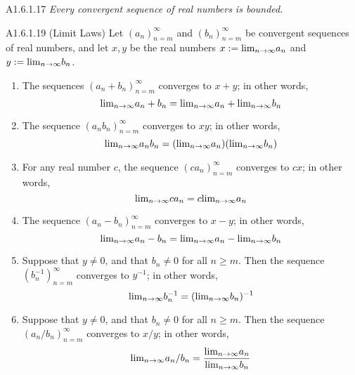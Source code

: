 \begin{corollary}{A1.6.1.17}
    \emph{Every convergent sequence of real numbers is bounded}.
\end{corollary}

\begin{theorem}{A1.6.1.19}
    (Limit Laws) Let $(a_n)_{n=m}^{\infty}$ and $(b_n)_{n=m}^{\infty}$ be convergent
    sequences of real numbers, and let $x, y$ be the real numbers $x := \text{lim}_{n \rightarrow \infty}{a_n}$
    and $y:= \text{lim}_{n \rightarrow \infty}{b_n}$.
    \begin{enumerate}
        \item The sequences $(a_n + b_n)_{n=m}^{\infty}$ converges to $x + y$; in other
        words,
        \begin{equation*}
            \text{lim}_{n \rightarrow \infty}{a_n + b_n} = \text{lim}_{n \rightarrow \infty}{a_n} + \text{lim}_{n \rightarrow \infty}{b_n}
        \end{equation*}
        \item The sequence $(a_n b_n)_{n=m}^{\infty}$ converges to $xy$; in other
        words,
        \begin{equation*}
            \text{lim}_{n \rightarrow \infty}{a_n b_n} = (\text{lim}_{n \rightarrow \infty}{a_n})(\text{lim}_{n \rightarrow \infty}{b_n})
        \end{equation*}
        \item For any real number $c$, the sequence $(ca_n)_{n=m}^{\infty}$ converges
        to $cx$; in other words,
        \begin{equation*}
            \text{lim}_{n \rightarrow \infty}{ca_n} = c\text{lim}_{n \rightarrow \infty}{a_n}
        \end{equation*}
        \item The sequence $(a_n - b_n)_{n=m}^{\infty}$ converges to $x - y$;
        in other words,
        \begin{equation*}
            \text{lim}_{n \rightarrow \infty}{a_n - b_n} = \text{lim}_{n \rightarrow \infty}{a_n} - \text{lim}_{n \rightarrow \infty}{b_n}
        \end{equation*}
        \item Suppose that $y \neq 0$, and that $b_n \neq 0$ for all $n \geq m$.
        Then the sequence $(b^{-1}_n)_{n=m}^{\infty}$ converges to $y^{-1}$; in
        other words,
        \begin{equation*}
            \text{lim}_{n \rightarrow \infty}{b^{-1}_n} = (\text{lim}_{n \rightarrow \infty}{b_n})^{-1}
        \end{equation*}
        \item Suppose that $y \neq 0$, and that $b_n \neq 0$ for all $n \geq m$.
        Then the sequence $(a_n / b_n)_{n=m}^{\infty}$ converges to $x/y$; in other
        words,
        \begin{equation*}
            \limit{a_n / b_n} = \frac{\limit{a_n}}{\limit{b_n}}

\end{equation*}
\end{enumerate}
\end{theorem}
